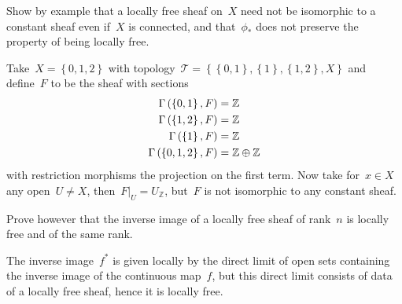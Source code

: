 \documentclass[a4paper,11pt,oneside,openany,article]{memoir}
\begin{document}
\begin{enumerate}
    Show by example that a locally free sheaf on~$X$ need not be isomorphic to a constant sheaf even if~$X$ is connected, and that~$\phi_*$ does not preserve the property of being locally free.

    \begin{solution}
      Take~$X=\left\{ 0,1,2 \right\}$ with topology~$\mathcal{T}=\left\{ \left\{ 0,1 \right\},\left\{ 1 \right\},\left\{ 1,2 \right\},X \right\}$ and define~$F$ to be the sheaf with sections
      \begin{align}
        \mathrm{\Gamma}\left( \left\{ 0,1 \right\},F \right)&=\mathbb{Z} \\
        \mathrm{\Gamma}\left( \left\{ 1,2 \right\},F \right)&=\mathbb{Z} \\
        \mathrm{\Gamma}\left( \left\{ 1 \right\},F \right)&=\mathbb{Z} \\
        \mathrm{\Gamma}\left( \left\{ 0,1,2 \right\},F \right)&=\mathbb{Z}\oplus\mathbb{Z}
      \end{align}
      with restriction morphisms the projection on the first term. Now take for~$x\in X$ any open~$U\neq X$, then~$F|_U=U_\mathbb{Z}$, but~$F$ is not isomorphic to any constant sheaf.
    \end{solution}

    Prove however that the inverse image of a locally free sheaf of rank~$n$ is locally free and of the same rank.

    \begin{solution}
      The inverse image~$f^*$ is given locally by the direct limit of open sets containing the inverse image of the continuous map~$f$, but this direct limit consists of data of a locally free sheaf, hence it is locally free.
    \end{solution}
\end{enumerate}
\end{document}
